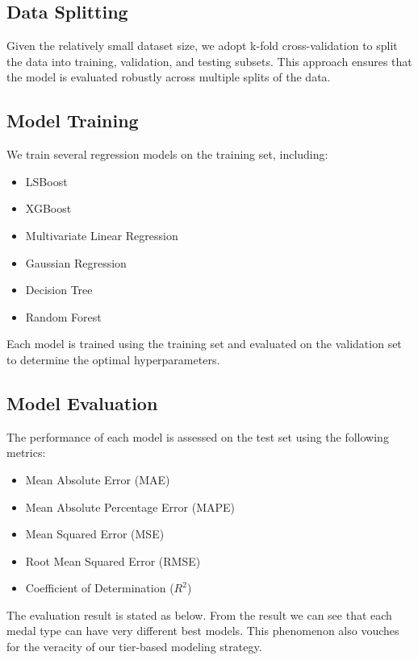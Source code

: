 \documentclass{mcmthesis}
\begin{document}
\subsection{Data Splitting}

Given the relatively small dataset size, we adopt k-fold cross-validation to split the data into training, validation, and testing subsets. This approach ensures that the model is evaluated robustly across multiple splits of the data.

\subsection{Model Training}

We train several regression models on the training set, including:
\begin{itemize}
    \item LSBoost
    \item XGBoost
    \item Multivariate Linear Regression
    \item Gaussian Regression
    \item Decision Tree
    \item Random Forest
\end{itemize}

Each model is trained using the training set and evaluated on the validation set to determine the optimal hyperparameters.

\subsection{Model Evaluation}

The performance of each model is assessed on the test set using the following metrics:
\begin{itemize}
    \item Mean Absolute Error (MAE)
    \item Mean Absolute Percentage Error (MAPE)
    \item Mean Squared Error (MSE)
    \item Root Mean Squared Error (RMSE)
    \item Coefficient of Determination ($R^2$)
\end{itemize}

The evaluation result is stated as below. From the result we can see that each medal type can have very different best models. This phenomenon also vouches for the veracity of our tier-based modeling strategy.
\end{document}
